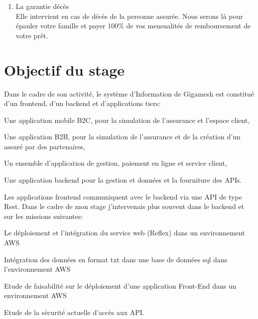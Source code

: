 \begin{enumerate}
\begin{list}{label}{spacing}
\begin{enumerate}
	 	\textbf{La couverture Assurly} : Gigamesh  sera là pour vous épauler et rembourser 100\% des mensualités du reste de votre prêt avec un plafond de 3 000 000 euros, quelle que soit votre perte de revenu. La garantie invalidité cesse au jour du 65ème anniversaire de l’assuré.
	 \end{enumerate}

\end{list}
\item La garantie décès\\
Elle intervient en cas de décès de la personne assurée. Nous serons là pour épauler votre famille et payer 100\% de vos mensualités de remboursement de votre prêt.

\end{enumerate}
\newpage
\section{Objectif du stage}
Dans le cadre de son activité, le système d'Information de Gigamesh est constitué d’un frontend, d’un backend et d’applications tiers:
\begin{list}{•}
\item  Une application mobile B2C, pour la simulation de l’assurance et l’espace client,
\item
\item  Une application B2B, pour la simulation de l’assurance et de la création d’un assuré par des partenaires,
\item  Un ensemble d’application de gestion, paiement en ligne et service client,
\item Une application backend pour la gestion et données et la fourniture des APIs.
\end{list}  
Les applications frontend communiquent avec le backend via une API de type Rest.
Dans le cadre de mon stage j’intervenais plus souvent dans le backend et sur les missions suivantes:
\begin{list}{•}
	\item Le déploiement et l’intégration du service web (Reflex) dans un environnement AWS
	\item
	\item Intégration des données en format txt dans une base de données sql dans l’environnement AWS
	\item Etude de faisabilité sur le déploiement d’une application Front-End dans un environnement AWS
	\item Etude de la sécurité actuelle d’accès aux API.
\end{list}
